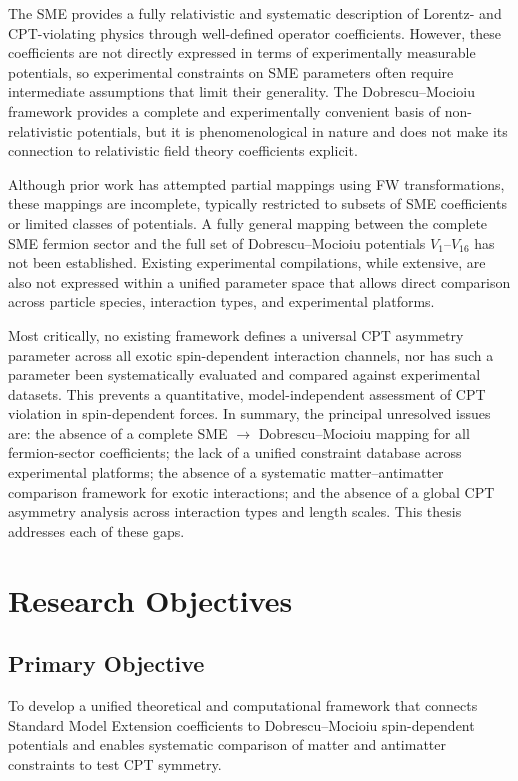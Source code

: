 \documentclass[12pt,a4paper]{report}
\begin{document}
The SME provides a fully relativistic and systematic description of Lorentz-
and CPT-violating physics through well-defined operator coefficients. However,
these coefficients are not directly expressed in terms of experimentally
measurable potentials, so experimental constraints on SME parameters often
require intermediate assumptions that limit their generality. The
Dobrescu--Mocioiu framework provides a complete and experimentally convenient
basis of non-relativistic potentials, but it is phenomenological in nature and
does not make its connection to relativistic field theory coefficients explicit.

Although prior work has attempted partial mappings using FW transformations,
these mappings are incomplete, typically restricted to subsets of SME
coefficients or limited classes of potentials. A fully general mapping between
the complete SME fermion sector and the full set of Dobrescu--Mocioiu potentials
$V_{1}$--$V_{16}$ has not been established. Existing experimental compilations,
while extensive, are also not expressed within a unified parameter space that
allows direct comparison across particle species, interaction types, and
experimental platforms.

Most critically, no existing framework defines a universal CPT asymmetry
parameter across all exotic spin-dependent interaction channels, nor has such a
parameter been systematically evaluated and compared against experimental
datasets. This prevents a quantitative, model-independent assessment of CPT
violation in spin-dependent forces. In summary, the principal unresolved issues
are: the absence of a complete SME $\to$ Dobrescu--Mocioiu mapping for all
fermion-sector coefficients; the lack of a unified constraint database across
experimental platforms; the absence of a systematic matter--antimatter
comparison framework for exotic interactions; and the absence of a global CPT
asymmetry analysis across interaction types and length scales. This thesis
addresses each of these gaps.

\section{Research Objectives}

\subsection*{Primary Objective}

To develop a unified theoretical and computational framework that connects
Standard Model Extension coefficients to Dobrescu--Mocioiu spin-dependent
potentials and enables systematic comparison of matter and antimatter
constraints to test CPT symmetry.
\end{document}
